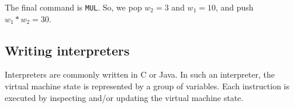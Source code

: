 \documentclass[a4paper, openany]{memoir}
\begin{document}
\noindent The final command is \texttt{MUL}. So, we pop $w_2 = 3$ and $w_1 = 10$, and push $w_1 * w_2 = 30$.
\begin{figure}[H]
    \centering
\end{figure}

\subsection{Writing interpreters}
Interpreters are commonly written in C or Java. In such an interpreter, the virtual machine state is represented by a group of variables. Each instruction is executed by inspecting and/or updating the virtual machine state.
\end{document}
